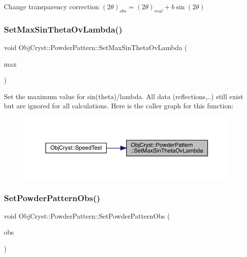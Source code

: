 Change transparency correction $ (2\theta)_{obs} = (2\theta)_{real} + b\sin(2\theta) $ \mbox{\label{class_obj_cryst_1_1_powder_pattern_a465b2fc0d398e7090142694a7d2a8976}} 
\subsubsection{\texorpdfstring{SetMaxSinThetaOvLambda()}{SetMaxSinThetaOvLambda()}}
{\footnotesize\ttfamily void Obj\+Cryst\+::\+Powder\+Pattern\+::\+Set\+Max\+Sin\+Theta\+Ov\+Lambda (\begin{DoxyParamCaption}\item[{const R\+E\+AL}]{max }\end{DoxyParamCaption})\hspace{0.3cm}{\ttfamily [virtual]}}

Set the maximum value for sin(theta)/lambda. All data (reflections,..) still exist but are ignored for all calculations. Here is the caller graph for this function\+:
\nopagebreak
\begin{figure}[H]
\begin{center}
\leavevmode
\includegraphics[width=350pt]{class_obj_cryst_1_1_powder_pattern_a465b2fc0d398e7090142694a7d2a8976_icgraph}
\end{center}
\end{figure}
\mbox{\label{class_obj_cryst_1_1_powder_pattern_a8562e190d277379e6e18d43f3d616976}} 
\subsubsection{\texorpdfstring{SetPowderPatternObs()}{SetPowderPatternObs()}}
{\footnotesize\ttfamily void Obj\+Cryst\+::\+Powder\+Pattern\+::\+Set\+Powder\+Pattern\+Obs (\begin{DoxyParamCaption}\item[{const Cryst\+Vector\+\_\+\+R\+E\+AL \&}]{obs }\end{DoxyParamCaption})}



